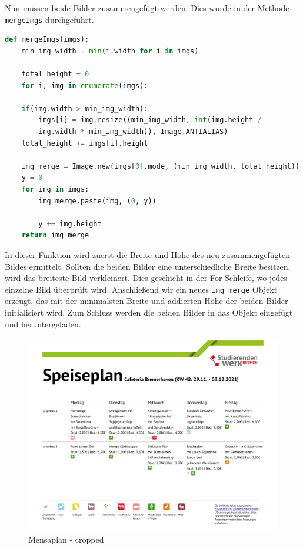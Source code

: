 Nun müssen beide Bilder zusammengefügt werden. Dies wurde in der Methode \verb|mergeImgs| durchgeführt.\\


\begin{lstlisting}[language=Python]
def mergeImgs(imgs):
    min_img_width = min(i.width for i in imgs)
    
    total_height = 0
    for i, img in enumerate(imgs):
    
    if(img.width > min_img_width):
        imgs[i] = img.resize((min_img_width, int(img.height / 
        img.width * min_img_width)), Image.ANTIALIAS)
    total_height += imgs[i].height
    
    img_merge = Image.new(imgs[0].mode, (min_img_width, total_height))
    y = 0
    for img in imgs:
        img_merge.paste(img, (0, y))
    
        y += img.height
    return img_merge
\end{lstlisting}

In dieser Funktion wird zuerst die Breite und Höhe des neu zusammengefügten Bildes ermittelt. Sollten die beiden Bilder eine unterschiedliche Breite besitzen, wird das breiteste Bild verkleinert. Dies geschieht in der For-Schleife, wo jedes einzelne Bild überprüft wird. 
Anschließend wir ein neues \verb|img_merge| Objekt erzeugt, das mit der minimalsten Breite und addierten Höhe der beiden Bilder initialisiert wird. Zum Schluss werden die beiden Bilder in das Objekt eingefügt und heruntergeladen.

\begin{figure}[H]
    \centering
    \includegraphics[width=15cm]{Figures/AppChapter/mensa_3.png}
    \caption{Mensaplan - cropped}
    \label{fig:Mensaplan}
    \centering
\end{figure}

